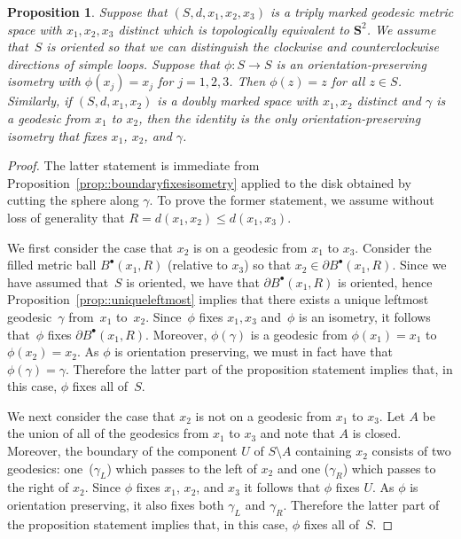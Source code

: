 \documentclass[10pt]{amsart}
\newcommand{\sbullet}{{\scriptscriptstyle\bullet}}
\theoremstyle{plain}
\numberwithin{theorem}{section}
\newtheorem{proposition}[theorem]{Proposition}
\theoremstyle{definition}
\renewcommand{\S}{{\mathbf S}}
\newcommand{\fb}[2]{B^\sbullet(#1,#2)}
\begin{document}
\begin{proposition}
\label{prop::threepointsfixisometry}
Suppose that $(S,d,x_1,x_2,x_3)$ is a triply marked geodesic metric space with $x_1,x_2,x_3$ distinct which is topologically equivalent to $\S^2$. We assume that~$S$ is oriented so that we can distinguish the clockwise and counterclockwise directions of simple loops. Suppose that $\phi \colon S \to S$ is an orientation-preserving isometry with $\phi(x_j) = x_j$ for $j=1,2,3$. Then $\phi(z) = z$ for all $z \in S$. Similarly, if $(S,d,x_1, x_2)$ is a doubly marked space with $x_1,x_2$ distinct and $\gamma$ is a geodesic from $x_1$ to $x_2$, then the identity is the only orientation-preserving isometry that fixes $x_1$, $x_2$, and $\gamma$.
\end{proposition}
\begin{proof}
The latter statement is immediate from Proposition~\ref{prop::boundaryfixesisometry} applied to the disk obtained by cutting the sphere along $\gamma$. To prove the former statement, we assume without loss of generality that $R = d(x_1,x_2) \leq d(x_1,x_3)$.

We first consider the case that $x_2$ is on a geodesic from $x_1$ to $x_3$. Consider the filled metric ball $\fb{x_1}{R}$ (relative to $x_3$) so that $x_2 \in \partial \fb{x_1}{R}$. Since we have assumed that~$S$ is oriented, we have that $\partial \fb{x_1}{R}$ is oriented, hence Proposition~\ref{prop::uniqueleftmost} implies that there exists a unique leftmost geodesic~$\gamma$ from~$x_1$ to~$x_2$. Since~$\phi$ fixes $x_1,x_3$ and~$\phi$ is an isometry, it follows that~$\phi$ fixes $\partial \fb{x_1}{R}$. Moreover, $\phi(\gamma)$ is a geodesic from $\phi(x_1) = x_1$ to $\phi(x_2) = x_2$. As $\phi$ is orientation preserving, we must in fact have that $\phi(\gamma) = \gamma$. Therefore the latter part of the proposition statement implies that, in this case, $\phi$ fixes all of~$S$.

We next consider the case that $x_2$ is not on a geodesic from $x_1$ to $x_3$. Let $A$ be the union of all of the geodesics from $x_1$ to $x_3$ and note that $A$ is closed. Moreover, the boundary of the component $U$ of $S \setminus A$ containing $x_2$ consists of two geodesics: one~($\gamma_L$) which passes to the left of $x_2$ and one ($\gamma_R$) which passes to the right of $x_2$. Since $\phi$ fixes $x_1$, $x_2$, and $x_3$ it follows that $\phi$ fixes $U$. As $\phi$ is orientation preserving, it also fixes both $\gamma_L$ and $\gamma_R$. Therefore the latter part of the proposition statement implies that, in this case, $\phi$ fixes all of~$S$.
\end{proof}
\end{document}
